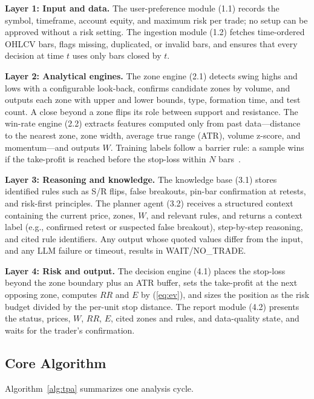 \documentclass[conference]{IEEEtran}
\begin{document}
\textbf{Layer 1: Input and data.} The user-preference module (1.1) records the symbol, timeframe, account equity, and maximum risk per trade; no setup can be approved without a risk setting. The ingestion module (1.2) fetches time-ordered OHLCV bars, flags missing, duplicated, or invalid bars, and ensures that every decision at time $t$ uses only bars closed by $t$.

\textbf{Layer 2: Analytical engines.} The zone engine (2.1) detects swing highs and lows with a configurable look-back, confirms candidate zones by volume, and outputs each zone with upper and lower bounds, type, formation time, and test count. A close beyond a zone flips its role between support and resistance. The win-rate engine (2.2) extracts features computed only from past data---distance to the nearest zone, zone width, average true range (ATR), volume z-score, and momentum---and outputs $W$. Training labels follow a barrier rule: a sample wins if the take-profit is reached before the stop-loss within $N$ bars~\cite{lopezdeprado2018advances}.

\textbf{Layer 3: Reasoning and knowledge.} The knowledge base (3.1) stores identified rules such as S/R flips, false breakouts, pin-bar confirmation at retests, and risk-first principles. The planner agent (3.2) receives a structured context containing the current price, zones, $W$, and relevant rules, and returns a context label (e.g., confirmed retest or suspected false breakout), step-by-step reasoning, and cited rule identifiers. Any output whose quoted values differ from the input, and any LLM failure or timeout, results in WAIT/NO\_TRADE.

\textbf{Layer 4: Risk and output.} The decision engine (4.1) places the stop-loss beyond the zone boundary plus an ATR buffer, sets the take-profit at the next opposing zone, computes $RR$ and $E$ by (\ref{eq:ev}), and sizes the position as the risk budget divided by the per-unit stop distance. The report module (4.2) presents the status, prices, $W$, $RR$, $E$, cited zones and rules, and data-quality state, and waits for the trader's confirmation.

\subsection{Core Algorithm}
Algorithm~\ref{alg:tpa} summarizes one analysis cycle.
\end{document}
